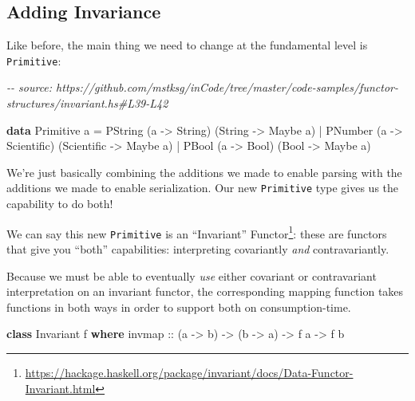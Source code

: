 \documentclass[]{article}
\newenvironment{Shaded}{}{}
\newcommand{\CommentTok}[1]{\textcolor[rgb]{0.38,0.63,0.69}{\textit{#1}}}
\newcommand{\DataTypeTok}[1]{\textcolor[rgb]{0.56,0.13,0.00}{#1}}
\newcommand{\KeywordTok}[1]{\textcolor[rgb]{0.00,0.44,0.13}{\textbf{#1}}}
\newcommand{\NormalTok}[1]{#1}
\newcommand{\OperatorTok}[1]{\textcolor[rgb]{0.40,0.40,0.40}{#1}}
\newcommand{\OtherTok}[1]{\textcolor[rgb]{0.00,0.44,0.13}{#1}}
\renewcommand{\href}[2]{#2\footnote{\url{#1}}}
\begin{document}
\subsection{Adding Invariance}\label{adding-invariance}

Like before, the main thing we need to change at the fundamental level is
\texttt{Primitive}:

\begin{Shaded}
\begin{Highlighting}[]
\CommentTok{{-}{-} source: https://github.com/mstksg/inCode/tree/master/code{-}samples/functor{-}structures/invariant.hs\#L39{-}L42}

\KeywordTok{data} \DataTypeTok{Primitive}\NormalTok{ a }\OtherTok{=}
      \DataTypeTok{PString}\NormalTok{ (a }\OtherTok{{-}\textgreater{}} \DataTypeTok{String}\NormalTok{)     (}\DataTypeTok{String}     \OtherTok{{-}\textgreater{}} \DataTypeTok{Maybe}\NormalTok{ a)}
    \OperatorTok{|} \DataTypeTok{PNumber}\NormalTok{ (a }\OtherTok{{-}\textgreater{}} \DataTypeTok{Scientific}\NormalTok{) (}\DataTypeTok{Scientific} \OtherTok{{-}\textgreater{}} \DataTypeTok{Maybe}\NormalTok{ a)}
    \OperatorTok{|} \DataTypeTok{PBool}\NormalTok{   (a }\OtherTok{{-}\textgreater{}} \DataTypeTok{Bool}\NormalTok{)       (}\DataTypeTok{Bool}       \OtherTok{{-}\textgreater{}} \DataTypeTok{Maybe}\NormalTok{ a)}
\end{Highlighting}
\end{Shaded}

We're just basically combining the additions we made to enable parsing with the
additions we made to enable serialization. Our new \texttt{Primitive} type gives
us the capability to do both!

We can say this new \texttt{Primitive} is an
\href{https://hackage.haskell.org/package/invariant/docs/Data-Functor-Invariant.html}{``Invariant''
Functor}: these are functors that give you ``both'' capabilities: interpreting
covariantly \emph{and} contravariantly.

Because we must be able to eventually \emph{use} either covariant or
contravariant interpretation on an invariant functor, the corresponding mapping
function takes functions in both ways in order to support both on
consumption-time.

\begin{Shaded}
\begin{Highlighting}[]
\KeywordTok{class} \DataTypeTok{Invariant}\NormalTok{ f }\KeywordTok{where}
\OtherTok{    invmap ::}\NormalTok{ (a }\OtherTok{{-}\textgreater{}}\NormalTok{ b) }\OtherTok{{-}\textgreater{}}\NormalTok{ (b }\OtherTok{{-}\textgreater{}}\NormalTok{ a) }\OtherTok{{-}\textgreater{}}\NormalTok{ f a }\OtherTok{{-}\textgreater{}}\NormalTok{ f b}
\end{Highlighting}
\end{Shaded}
\end{document}
